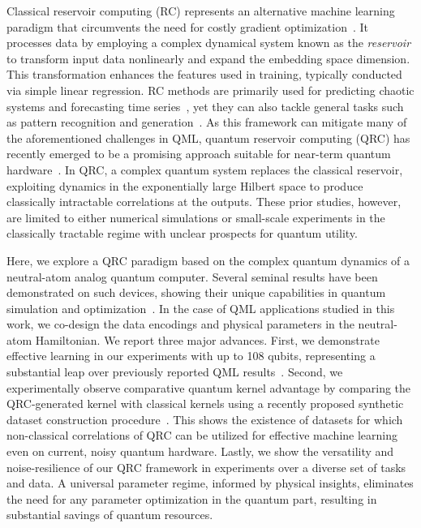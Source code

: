 \documentclass[english,floatfix,twocolumn,showpacs, aps, prx, reprint, superscriptaddress, longbibliography]{revtex4-2}
\newcommand{\commentout}[1]{}
\begin{document}
Classical reservoir computing (RC) represents an alternative machine learning paradigm that circumvents the need for costly gradient optimization~\cite{Jaeger2004}\commentout{\cite{Jaeger2004, Jaeger2007, Lukosevicius2009, Tanaka2019, Gauthier2021}}. It processes data by employing a complex dynamical system known as the \emph{reservoir} to transform input data nonlinearly and expand the embedding space dimension. This transformation enhances the features used in training, typically conducted via simple linear regression. RC methods are primarily used for predicting chaotic systems and forecasting time series~\cite{Jaeger2001, Arcomano2023}, yet they can also tackle general tasks such as pattern recognition and generation~\cite{Jalalvand2015, Schaetti2016}. As this framework can mitigate many of the aforementioned challenges in QML, quantum reservoir computing (QRC) has recently emerged to be a promising approach suitable for near-term quantum hardware~\cite{Fujii2017, Martinez2021,  Bravo2022,  Dudas2023, Mujal2023, Hu2023, Senanian2023, Yasuda2023}. In QRC, a complex quantum system replaces the classical reservoir, exploiting dynamics in the exponentially large Hilbert space to produce classically intractable correlations at the outputs. These prior studies, however, are limited to either numerical simulations or small-scale experiments in the classically tractable regime with unclear prospects for quantum utility. 

Here, we explore a QRC paradigm based on the complex quantum dynamics of a neutral-atom analog quantum computer. Several seminal results have been demonstrated on such devices, showing their unique capabilities in quantum simulation and optimization~\cite{Scholl2021, Ebadi2021, Semeghini2021, Ebadi2022}. In the case of QML applications studied in this work, we co-design the data encodings and physical parameters in the neutral-atom Hamiltonian. We report three major advances. First, we demonstrate effective learning in our experiments with up to 108 qubits, representing a substantial leap over previously reported QML results~\cite{ Johri2021, Huang2022, Hu2023, Senanian2023,Yasuda2023,Albrecht2023, Haug2023, Jennifer24}. Second, we experimentally observe comparative quantum kernel advantage by comparing the QRC-generated kernel with classical kernels using a recently proposed synthetic dataset construction procedure~\cite{Huang2021}. This shows the existence of datasets for which non-classical correlations of QRC can be utilized for effective machine learning even on current, noisy quantum hardware. Lastly, we show the versatility and noise-resilience of our QRC framework in experiments over a diverse set of tasks and data. A universal parameter regime, informed by physical insights, eliminates the need for any parameter optimization in the quantum part, resulting in substantial savings of quantum resources.
\end{document}
